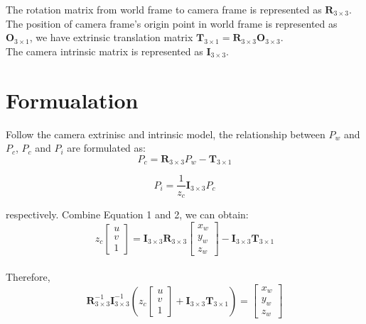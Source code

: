 \documentclass[
	letterpaper,
	10pt, 
]{CSUniSchoolLabReport}
\begin{document}
The rotation matrix from world frame to camera frame is represented as $\bm{R}_{3\times 3}$.\\
The position of camera frame's origin point in world frame is represented as $\bm{O}_{3\times 1}$, we have extrinsic translation matrix $\bm{T}_{3\times 1} = \bm{R}_{3\times 3} \bm{O}_{3\times 3}$. \\
The camera intrinsic matrix is represented as $\bm{I}_{3\times 3}$.\\


\section{Formualation}
Follow the camera extrinisc and intrinsic model, the relationship between $P_w$ and $P_c$, $P_c$ and $P_i$ are formulated as:
\begin{equation}
P_c = \bm{R}_{3\times 3} P_w - \bm{T}_{3\times 1}
\end{equation}

\begin{equation}
P_i = \frac{1}{z_c}\bm{I}_{3\times 3} P_c
\end{equation}

respectively. Combine Equation 1 and 2, we can obtain:
\begin{equation}
z_c \begin{bmatrix}
u \\
v \\
1
\end{bmatrix} = \bm{I}_{3\times 3}\bm{R}_{3\times 3} \begin{bmatrix}
x_w \\
y_w \\
z_w
\end{bmatrix} - \bm{I}_{3\times 3}\bm{T}_{3\times 1}
\end{equation} \\

Therefore, 
\begin{equation}
\bm{R}^{-1}_{3\times 3}\bm{I}^{-1}_{3\times 3}\left(z_c \begin{bmatrix}
u \\
v \\
1
\end{bmatrix} + \bm{I}_{3\times 3}\bm{T}_{3\times 1} \right) = \begin{bmatrix}
x_w \\
y_w \\
z_w
\end{bmatrix}
\end{equation}
\end{document}
